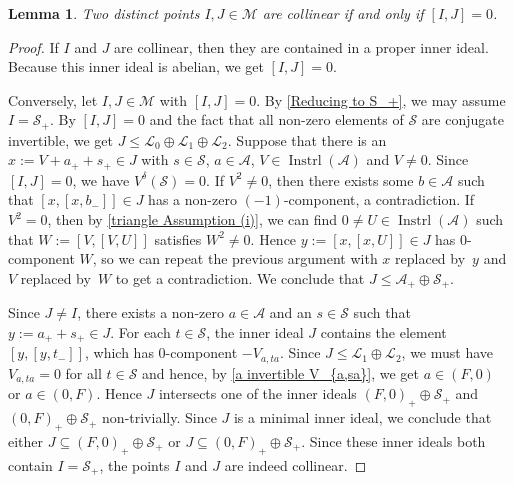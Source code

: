\documentclass[oneside,a4paper]{amsart} %
\newtheorem{lemma}[theorem]{Lemma}
\theoremstyle{definition}
\DeclareMathOperator{\Inst}{Instrl}
\newcommand{\A}{\mathcal{A}}
\renewcommand{\SS}{\mathcal{S}}
\newcommand{\LL}{\mathcal{L}}
\newcommand{\M}{\mathcal{M}}
\newcommand{\dash}{\nobreakdash-\hspace{0pt}}
\numberwithin{equation}{section}
\begin{document}
\begin{lemma}
\label{triangle distance 1}
	Two distinct points $I,J\in\M$ are collinear if and only if $[I,J]=0$.
\end{lemma}
\begin{proof}
	If $I$ and $J$ are collinear, then they are contained in a proper inner ideal.
	Because this inner ideal is abelian, we get $[I,J]=0$.
	
	Conversely, let $I,J\in\M$ with $[I,J]=0$.
	By \cref{Reducing to S_+}, we may assume $I=\SS_+$.
	By $[I,J]=0$ and the fact that all non-zero elements of $\SS$ are conjugate invertible, we get $J\leq \LL_0\oplus \LL_1\oplus \LL_2$.
	Suppose that there is an $x := V + a_+ + s_+ \in J$ with $s\in\SS$, $a\in\A$, $V\in\Inst (\A)$ and $V\neq 0$.
	Since $[I,J]=0$, we have $V^\delta(\SS)=0$.
	If $V^2\neq 0$, then there exists some $b\in\A$ such that $[x,[x,b_-]]\in J$ has a non-zero $(-1)$-component, a contradiction.
	If $V^2=0$, then by \cref{triangle Assumption (i)}, we can find $0\neq U\in\Inst(\A)$ such that $W:=[V,[V,U]]$ satisfies $W^2\neq 0$.
	Hence $y := [x,[x,U]] \in J$ has $0$-component $W$, so we can repeat the previous argument with $x$ replaced by~$y$ and $V$ replaced by~$W$ to get a contradiction.
	We conclude that $J\leq \A_+\oplus \SS_+$.
	
	Since $J\neq I$, there exists a non-zero $a\in\A$ and an $s\in\SS$ such that $y := a_+ + s_+\in J$.
	For each $t\in\SS$, the inner ideal $J$ contains the element $[y,[y,t_-]]$, which has $0$\dash component $-V_{a,ta}$.
	Since $J \leq \LL_1 \oplus \LL_2$, we must have $V_{a,ta}=0$ for all $t \in \SS$ and hence, by \cref{a invertible V_{a,sa}}, we get $a\in (F,0)$ or $a\in (0,F)$.
	Hence $J$ intersects one of the inner ideals $(F,0)_+\oplus\SS_+$ and $(0,F)_+\oplus\SS_+$ non-trivially.
	Since $J$ is a minimal inner ideal, we conclude that either $J \subseteq (F,0)_+\oplus \SS_+$ or $J \subseteq (0,F)_+\oplus\SS_+$.
	Since these inner ideals both contain $I = \SS_+$, the points $I$ and $J$ are indeed collinear.
\end{proof}
\end{document}
